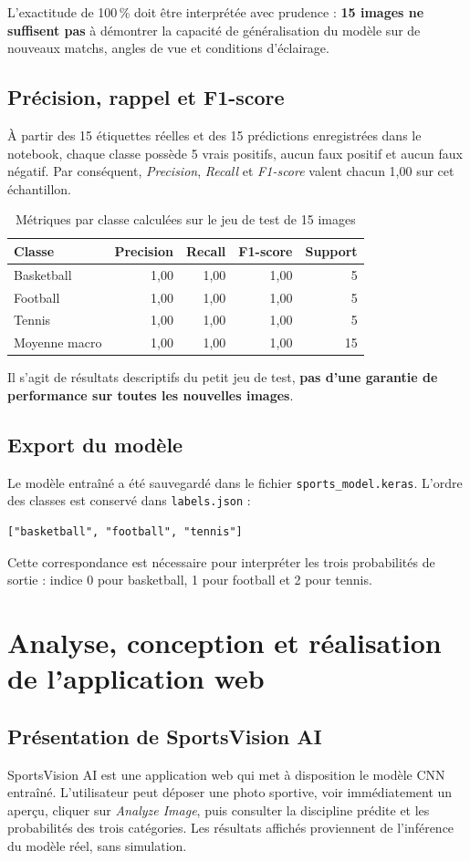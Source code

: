 \documentclass[11pt,a4paper,oneside]{report}
\begin{document}
L'exactitude de 100\,\% doit être interprétée avec prudence : \textbf{15 images ne suffisent pas} à démontrer la capacité de généralisation du modèle sur de nouveaux matchs, angles de vue et conditions d'éclairage.

\section{Précision, rappel et F1-score}
À partir des 15 étiquettes réelles et des 15 prédictions enregistrées dans le notebook, chaque classe possède 5 vrais positifs, aucun faux positif et aucun faux négatif. Par conséquent, \emph{Precision}, \emph{Recall} et \emph{F1-score} valent chacun 1,00 sur cet échantillon.
\begin{table}[H]\centering
\caption{Métriques par classe calculées sur le jeu de test de 15 images}
\begin{tabular}{lrrrr}
\toprule
\textbf{Classe}&\textbf{Precision}&\textbf{Recall}&\textbf{F1-score}&\textbf{Support}\\
\midrule
Basketball &1,00&1,00&1,00&5\\
Football &1,00&1,00&1,00&5\\
Tennis &1,00&1,00&1,00&5\\
\midrule
Moyenne macro &1,00&1,00&1,00&15\\
\bottomrule
\end{tabular}
\end{table}
Il s'agit de résultats descriptifs du petit jeu de test, \textbf{pas d'une garantie de performance sur toutes les nouvelles images}.

\section{Export du modèle}
Le modèle entraîné a été sauvegardé dans le fichier \texttt{sports\_model.keras}. L'ordre des classes est conservé dans \texttt{labels.json} :
\begin{lstlisting}
["basketball", "football", "tennis"]
\end{lstlisting}
Cette correspondance est nécessaire pour interpréter les trois probabilités de sortie : indice 0 pour basketball, 1 pour football et 2 pour tennis.

\chapter{Analyse, conception et réalisation de l'application web}
\section{Présentation de SportsVision AI}
SportsVision AI est une application web qui met à disposition le modèle CNN entraîné. L'utilisateur peut déposer une photo sportive, voir immédiatement un aperçu, cliquer sur \emph{Analyze Image}, puis consulter la discipline prédite et les probabilités des trois catégories. Les résultats affichés proviennent de l'inférence du modèle réel, sans simulation.
\end{document}
